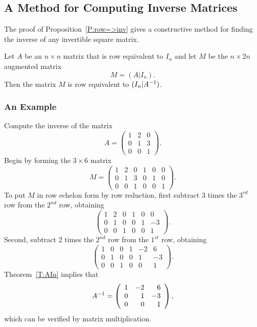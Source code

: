 \documentclass{ximera}
\begin{document}
\subsection*{A Method for Computing Inverse Matrices}

The proof of Proposition~\ref{P:row=>inv} gives a constructive method
for finding the inverse of any invertible square matrix.

\begin{theorem}  \label{T:AIn}
Let $A$ be an $n\times n$ matrix that is row equivalent to
$I_n$ and let $M$ be the $n\times 2n$ augmented matrix
\begin{equation}  \label{e:M}
M = (A | I_n).
\end{equation}
Then the matrix $M$ is row equivalent to $(I_n | A^{-1})$.
\end{theorem}

\subsubsection*{An Example}

Compute the inverse of the matrix
\[
A = \left(\begin{array}{rrr} 1 & 2 & 0 \\ 0 & 1 & 3 \\ 0 & 0 & 1
\end{array}\right).
\]
Begin by forming the $3\times 6$ matrix
\[
M = \left(\begin{array}{rrr|rrr} 1 & 2 & 0 & 1 & 0 & 0 \\
0 & 1 & 3 & 0 & 1 & 0 \\ 0 & 0 & 1 & 0 & 0 & 1
\end{array}\right).
\]
To put $M$ in row echelon form by row reduction, first subtract
3 times the $3^{rd}$ row from the $2^{nd}$ row, obtaining
\[
\left(\begin{array}{rrr|rrr} 1 & 2 & 0 & 1 & 0 & 0 \\
0 & 1 & 0 & 0 & 1 & -3 \\ 0 & 0 & 1 & 0 & 0 & 1
\end{array}\right).
\]
Second, subtract 2 times the $2^{nd}$ row from the $1^{st}$ row, obtaining
\[
\left(\begin{array}{rrr|rrr} 1 & 0 & 0 & 1 & -2 & 6 \\
0 & 1 & 0 & 0 & 1 & -3 \\ 0 & 0 & 1 & 0 & 0 & 1
\end{array}\right).
\]
Theorem~\ref{T:AIn} implies that
\[
A^{-1} = \left(\begin{array}{rrr} 1 & -2 & 6 \\ 0 & 1 & -3 \\ 0 & 0 & 1
\end{array}\right),
\]
which can be verified by matrix multiplication.
\end{document}
